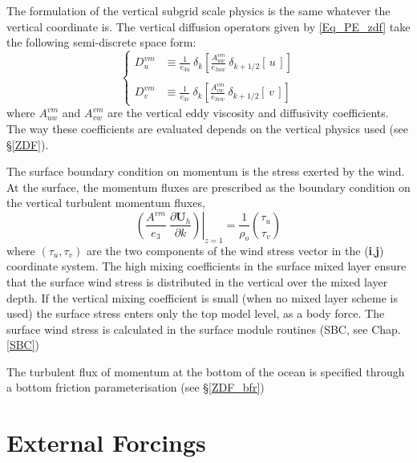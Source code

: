 \documentclass[NEMO_book]{subfiles}
\begin{document}
The formulation of the vertical subgrid scale physics is the same whatever 
the vertical coordinate is. The vertical diffusion operators given by 
\eqref{Eq_PE_zdf} take the following semi-discrete space form:
\begin{equation} \label{Eq_dynzdf}
\left\{   \begin{aligned}
D_u^{vm} &\equiv \frac{1}{e_{3u}} \ \delta _k \left[ \frac{A_{uw}^{vm} }{e_{3uw} }
                              \ \delta _{k+1/2} [\,u\,]         \right]     \\
\\
D_v^{vm} &\equiv \frac{1}{e_{3v}} \ \delta _k \left[ \frac{A_{vw}^{vm} }{e_{3vw} }
                              \ \delta _{k+1/2} [\,v\,]         \right]
\end{aligned}   \right.
\end{equation} 
where $A_{uw}^{vm} $ and $A_{vw}^{vm} $ are the vertical eddy viscosity and 
diffusivity coefficients. The way these coefficients are evaluated 
depends on the vertical physics used (see \S\ref{ZDF}).

The surface boundary condition on momentum is the stress exerted by 
the wind. At the surface, the momentum fluxes are prescribed as the boundary 
condition on the vertical turbulent momentum fluxes,
\begin{equation} \label{Eq_dynzdf_sbc}
\left.{\left( {\frac{A^{vm} }{e_3 }\ \frac{\partial \textbf{U}_h}{\partial k}} \right)} \right|_{z=1}
	 = \frac{1}{\rho _o} \binom{\tau _u}{\tau _v }
\end{equation}
where $\left( \tau _u ,\tau _v \right)$ are the two components of the wind stress 
vector in the (\textbf{i},\textbf{j}) coordinate system. The high mixing coefficients 
in the surface mixed layer ensure that the surface wind stress is distributed in 
the vertical over the mixed layer depth. If the vertical mixing coefficient 
is small (when no mixed layer scheme is used) the surface stress enters only 
the top model level, as a body force. The surface wind stress is calculated 
in the surface module routines (SBC, see Chap.\ref{SBC})

The turbulent flux of momentum at the bottom of the ocean is specified through 
a bottom friction parameterisation (see \S\ref{ZDF_bfr})

\section{External Forcings}
\label{DYN_forcing}
\end{document}
